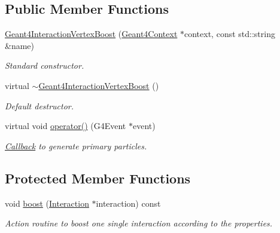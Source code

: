 \subsection*{Public Member Functions}
\begin{DoxyCompactItemize}
\item 
\hyperlink{class_d_d4hep_1_1_simulation_1_1_geant4_interaction_vertex_boost_a244dd1d7ef8eee7b9ee8a40a09a1963d}{Geant4InteractionVertexBoost} (\hyperlink{class_d_d4hep_1_1_simulation_1_1_geant4_context}{Geant4Context} $\ast$context, const std::string \&name)
\begin{DoxyCompactList}\small\item\em Standard constructor. \item\end{DoxyCompactList}\item 
virtual \hyperlink{class_d_d4hep_1_1_simulation_1_1_geant4_interaction_vertex_boost_a06fa61bb33bf2286f1abb7b0af507b77}{$\sim$Geant4InteractionVertexBoost} ()
\begin{DoxyCompactList}\small\item\em Default destructor. \item\end{DoxyCompactList}\item 
virtual void \hyperlink{class_d_d4hep_1_1_simulation_1_1_geant4_interaction_vertex_boost_ab66ab43b06523e720a1e377ecd065a66}{operator()} (G4Event $\ast$event)
\begin{DoxyCompactList}\small\item\em \hyperlink{class_d_d4hep_1_1_callback}{Callback} to generate primary particles. \item\end{DoxyCompactList}\end{DoxyCompactItemize}
\subsection*{Protected Member Functions}
\begin{DoxyCompactItemize}
\item 
void \hyperlink{class_d_d4hep_1_1_simulation_1_1_geant4_interaction_vertex_boost_a33258e2ee3bc6a436f17bce6bd41f972}{boost} (\hyperlink{class_d_d4hep_1_1_simulation_1_1_geant4_primary_interaction}{Interaction} $\ast$interaction) const 
\begin{DoxyCompactList}\small\item\em Action routine to boost one single interaction according to the properties. \item\end{DoxyCompactList}\end{DoxyCompactItemize}
